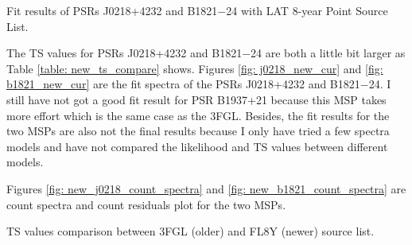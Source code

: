 \documentclass[a4paper, 12pt]{report}
\newcommand{\mycaption}[1]{\protect \caption{#1}}
\begin{document}
    \begin{table}[!htp]
      \centering
        \mycaption{Fit results of PSRs J0218+4232 and B1821$-$24 with LAT 8-year Point 
          Source List.}
        \label{table: new_results_all_three}        
    \end{table}  
  
    The TS values for PSRs J0218+4232 and B1821$-$24 are both a little bit larger as Table 
    \ref{table: new_ts_compare} shows. Figures \ref{fig: j0218_new_cur} and 
    \ref{fig: b1821_new_cur} are the fit spectra of the PSRs
    J0218+4232 and B1821$-$24. I still have not got a good fit result for PSR B1937+21 because 
    this MSP takes more effort which is the same case as the 3FGL. Besides, the fit 
    results for the two MSPs are also not the final results because I only have tried a 
    few spectra models and have not compared the likelihood and TS values between different 
    models. 

    Figures \ref{fig: new_j0218_count_spectra} and \ref{fig: new_b1821_count_spectra} are 
    count spectra and count residuals plot for the two MSPs. 
    \begin{table}[!htp]
      \centering
        \mycaption{TS values comparison between 3FGL (older) and FL8Y (newer) source list.}
        \label{table: new_ts_compare}        
    \end{table}  
    
\end{document}
